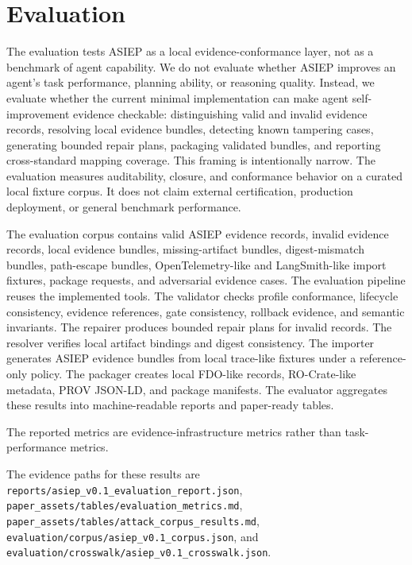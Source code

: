 \section{Evaluation}

The evaluation tests ASIEP as a local evidence-conformance layer, not as a benchmark of agent capability. We do not evaluate whether ASIEP improves an agent's task performance, planning ability, or reasoning quality. Instead, we evaluate whether the current minimal implementation can make agent self-improvement evidence checkable: distinguishing valid and invalid evidence records, resolving local evidence bundles, detecting known tampering cases, generating bounded repair plans, packaging validated bundles, and reporting cross-standard mapping coverage. This framing is intentionally narrow. The evaluation measures auditability, closure, and conformance behavior on a curated local fixture corpus. It does not claim external certification, production deployment, or general benchmark performance.

The evaluation corpus contains valid ASIEP evidence records, invalid evidence records, local evidence bundles, missing-artifact bundles, digest-mismatch bundles, path-escape bundles, OpenTelemetry-like and LangSmith-like import fixtures, package requests, and adversarial evidence cases. The evaluation pipeline reuses the implemented tools. The validator checks profile conformance, lifecycle consistency, evidence references, gate consistency, rollback evidence, and semantic invariants. The repairer produces bounded repair plans for invalid records. The resolver verifies local artifact bindings and digest consistency. The importer generates ASIEP evidence bundles from local trace-like fixtures under a reference-only policy. The packager creates local FDO-like records, RO-Crate-like metadata, PROV JSON-LD, and package manifests. The evaluator aggregates these results into machine-readable reports and paper-ready tables.

The reported metrics are evidence-infrastructure metrics rather than task-performance metrics.



The evidence paths for these results are \texttt{reports/asiep\_v0.1\_evaluation\_report.json}, \texttt{paper\_assets/tables/evaluation\_metrics.md}, \texttt{paper\_assets/tables/attack\_corpus\_results.md}, \texttt{evaluation/corpus/asiep\_v0.1\_corpus.json}, and \texttt{evaluation/crosswalk/asiep\_v0.1\_crosswalk.json}.

